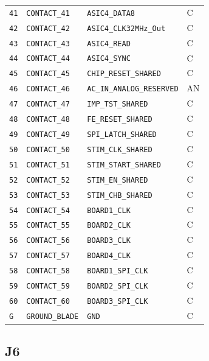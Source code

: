 \documentclass[10pt,a4paper]{article}
\begin{document}
\begin{longtable}{@{}P{15mm}P{42mm}P{92mm}P{10mm}@{}}
\nolinkurl{41} & \nolinkurl{CONTACT_41} & \nolinkurl{ASIC4_DATA8} & C \\
\nolinkurl{42} & \nolinkurl{CONTACT_42} & \nolinkurl{ASIC4_CLK32MHz_Out} & C \\
\nolinkurl{43} & \nolinkurl{CONTACT_43} & \nolinkurl{ASIC4_READ} & C \\
\nolinkurl{44} & \nolinkurl{CONTACT_44} & \nolinkurl{ASIC4_SYNC} & C \\
\nolinkurl{45} & \nolinkurl{CONTACT_45} & \nolinkurl{CHIP_RESET_SHARED} & C \\
\nolinkurl{46} & \nolinkurl{CONTACT_46} & \nolinkurl{AC_IN_ANALOG_RESERVED} & AN \\
\nolinkurl{47} & \nolinkurl{CONTACT_47} & \nolinkurl{IMP_TST_SHARED} & C \\
\nolinkurl{48} & \nolinkurl{CONTACT_48} & \nolinkurl{FE_RESET_SHARED} & C \\
\nolinkurl{49} & \nolinkurl{CONTACT_49} & \nolinkurl{SPI_LATCH_SHARED} & C \\
\nolinkurl{50} & \nolinkurl{CONTACT_50} & \nolinkurl{STIM_CLK_SHARED} & C \\
\nolinkurl{51} & \nolinkurl{CONTACT_51} & \nolinkurl{STIM_START_SHARED} & C \\
\nolinkurl{52} & \nolinkurl{CONTACT_52} & \nolinkurl{STIM_EN_SHARED} & C \\
\nolinkurl{53} & \nolinkurl{CONTACT_53} & \nolinkurl{STIM_CHB_SHARED} & C \\
\nolinkurl{54} & \nolinkurl{CONTACT_54} & \nolinkurl{BOARD1_CLK} & C \\
\nolinkurl{55} & \nolinkurl{CONTACT_55} & \nolinkurl{BOARD2_CLK} & C \\
\nolinkurl{56} & \nolinkurl{CONTACT_56} & \nolinkurl{BOARD3_CLK} & C \\
\nolinkurl{57} & \nolinkurl{CONTACT_57} & \nolinkurl{BOARD4_CLK} & C \\
\nolinkurl{58} & \nolinkurl{CONTACT_58} & \nolinkurl{BOARD1_SPI_CLK} & C \\
\nolinkurl{59} & \nolinkurl{CONTACT_59} & \nolinkurl{BOARD2_SPI_CLK} & C \\
\nolinkurl{60} & \nolinkurl{CONTACT_60} & \nolinkurl{BOARD3_SPI_CLK} & C \\
\nolinkurl{G} & \nolinkurl{GROUND_BLADE} & \nolinkurl{GND} & C \\
\end{longtable}\endgroup

\Needspace{32mm}\subsection*{J6}
\end{document}
